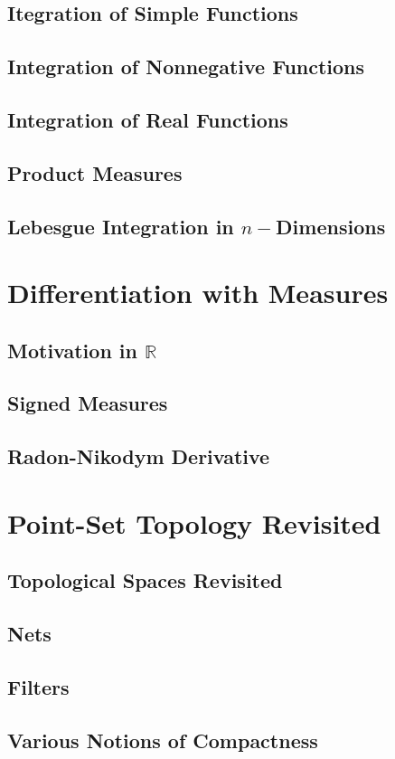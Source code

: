 \documentclass{article}
\newcommand{\R}{\mathbb{R}}
\theoremstyle{definition}
\begin{document}
\subsection{Itegration of Simple Functions}
\subsection{Integration of Nonnegative Functions}
\subsection{Integration of Real Functions}
\subsection{Product Measures}
\subsection{Lebesgue Integration in $ n- $Dimensions}
\section{Differentiation with Measures}
\subsection{Motivation in $ \R $}
\subsection{Signed Measures}
\subsection{Radon-Nikodym Derivative}
\section{Point-Set Topology Revisited}
\subsection{Topological Spaces Revisited}
\subsection{Nets}
\subsection{Filters}
\subsection{Various Notions of Compactness}
\end{document}
